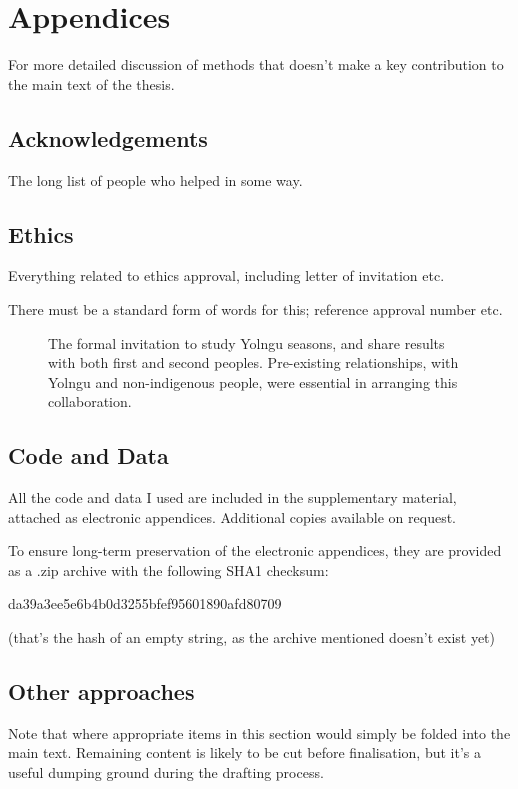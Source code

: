 \chapter{Appendices}
For more detailed discussion of methods that doesn't make a key contribution to the main text of the thesis.

\section{Acknowledgements}
The long list of people who helped in some way.


\section{Ethics} \label{sec:ethics}
Everything related to ethics approval, including letter of invitation etc.

There must be a standard form of words for this; reference approval number etc.

\begin{figure}[p]
    \centering
    \caption[Letter of invitation for collaborative research]{
        The formal invitation to study Yolngu seasons,
        and share results with both first and second peoples.
        Pre-existing relationships, with Yolngu and non-indigenous people,
        were essential in arranging this collaboration.
        }
    \label{app:invitation-letter}
\end{figure}


\section{Code and Data} \label{sec:appendix-code}
All the code and data I used are included in the supplementary material,
attached as electronic appendices.  Additional copies available on request.

To ensure long-term preservation of the electronic appendices, they
are provided as a .zip archive with the following SHA1 checksum:

da39a3ee5e6b4b0d3255bfef95601890afd80709

(that's the hash of an empty string, as the archive mentioned doesn't exist yet)



\section{Other approaches}
Note that where appropriate items in this section would simply be folded into the main text.
Remaining content is likely to be cut before finalisation,
but it's a useful dumping ground during the drafting process.

